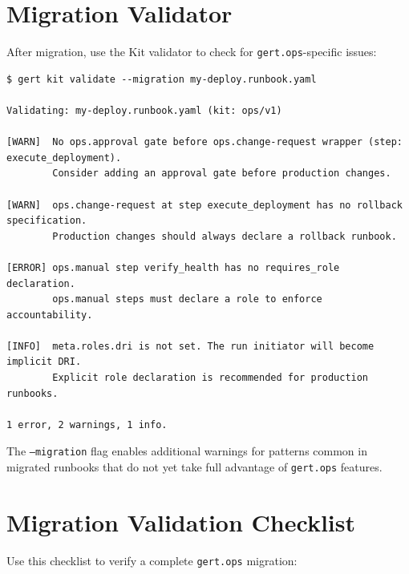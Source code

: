 \section{Migration Validator}
\label{sec:migration-validator}

After migration, use the Kit validator to check for \texttt{gert.ops}-specific issues:

\begin{verbatim}
$ gert kit validate --migration my-deploy.runbook.yaml

Validating: my-deploy.runbook.yaml (kit: ops/v1)

[WARN]  No ops.approval gate before ops.change-request wrapper (step: execute_deployment).
        Consider adding an approval gate before production changes.

[WARN]  ops.change-request at step execute_deployment has no rollback specification.
        Production changes should always declare a rollback runbook.

[ERROR] ops.manual step verify_health has no requires_role declaration.
        ops.manual steps must declare a role to enforce accountability.

[INFO]  meta.roles.dri is not set. The run initiator will become implicit DRI.
        Explicit role declaration is recommended for production runbooks.

1 error, 2 warnings, 1 info.
\end{verbatim}

The \texttt{--migration} flag enables additional warnings for patterns common in migrated
runbooks that do not yet take full advantage of \texttt{gert.ops} features.

\section{Migration Validation Checklist}
\label{sec:migration-checklist}

Use this checklist to verify a complete \texttt{gert.ops} migration:

